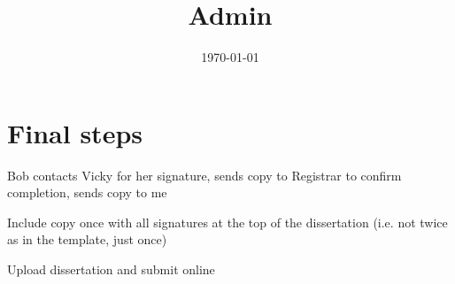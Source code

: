 \documentclass[12pt]{article}
\title{Admin}
\date{\today}
\begin{document}
\maketitle

\section*{Final steps}
	\begin{coi}
		\item Bob contacts Vicky for her signature, sends copy to Registrar to confirm completion, sends copy to me
		\item Include copy once with all signatures at the top of the dissertation (i.e. not twice as in the template, just once)
		\item Upload dissertation and submit online
	\end{coi}
\end{document}
